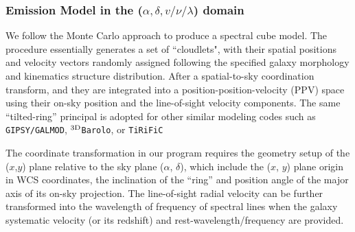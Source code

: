 \documentclass[twocolumn,tighten]{aastex62}
\newcommand{\barolo}{{\tt $^{\rm 3D}$Barolo}}
\newcommand{\tirific}{{\tt TiRiFiC}}
\newcommand{\galmod}{{\tt GIPSY/GALMOD}}
\begin{document}
%
%


%


\subsubsection{Emission Model in the ($\alpha, \delta, v/\nu/\lambda$) domain}

We follow the Monte Carlo approach to produce a spectral cube model. 
The procedure essentially generates a set of ``cloudlets", with their spatial positions and velocity vectors randomly assigned following the specified galaxy morphology and kinematics structure distribution. After a spatial-to-sky coordination transform, and they are integrated into a position-position-velocity (PPV) space using their on-sky position and the line-of-sight velocity components. The same ``tilted-ring'' principal \citep{Rogstad:1974aa} is adopted for other similar modeling codes such as \galmod,
\barolo, or \tirific\ \citep{van-der-Hulst:1992aa,Jozsa:2007aa,Di-Teodoro:2015aa,Bouche:2015aa}

The coordinate transformation in our program requires the geometry setup of the ($x$,$y$) plane relative to the sky plane ($\alpha$, $\delta$), which include the ($x$, $y$) plane origin in WCS coordinates, the inclination of the ``ring'' and position angle of the major axis of its on-sky projection.
The line-of-sight radial velocity can be further transformed into the wavelength of frequency of spectral lines when the galaxy systematic velocity (or its redshift) and rest-wavelength/frequency are provided.
\end{document}
